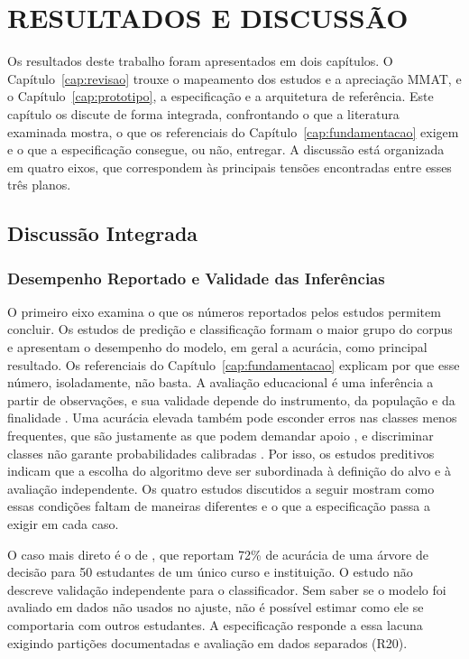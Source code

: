 \chapter{RESULTADOS E DISCUSSÃO}
\label{cap:resultados-discussao}

Os resultados deste trabalho foram apresentados em dois capítulos. O Capítulo~\ref{cap:revisao} trouxe o mapeamento dos estudos e a apreciação MMAT, e o Capítulo~\ref{cap:prototipo}, a especificação e a arquitetura de referência. Este capítulo os discute de forma integrada, confrontando o que a literatura examinada mostra, o que os referenciais do Capítulo~\ref{cap:fundamentacao} exigem e o que a especificação consegue, ou não, entregar. A discussão está organizada em quatro eixos, que correspondem às principais tensões encontradas entre esses três planos.

\section{Discussão Integrada}

\subsection{Desempenho Reportado e Validade das Inferências}

O primeiro eixo examina o que os números reportados pelos estudos permitem concluir. Os estudos de predição e classificação formam o maior grupo do corpus e apresentam o desempenho do modelo, em geral a acurácia, como principal resultado. Os referenciais do Capítulo~\ref{cap:fundamentacao} explicam por que esse número, isoladamente, não basta. A avaliação educacional é uma inferência a partir de observações, e sua validade depende do instrumento, da população e da finalidade \cite{NRC2001}. Uma acurácia elevada também pode esconder erros nas classes menos frequentes, que são justamente as que podem demandar apoio \cite{James2021}, e discriminar classes não garante probabilidades calibradas \cite{NiculescuMizilCaruana2005}. Por isso, os estudos preditivos indicam que a escolha do algoritmo deve ser subordinada à definição do alvo e à avaliação independente. Os quatro estudos discutidos a seguir mostram como essas condições faltam de maneiras diferentes e o que a especificação passa a exigir em cada caso.

O caso mais direto é o de , que reportam 72\% de acurácia de uma árvore de decisão para 50 estudantes de um único curso e instituição. O estudo não descreve validação independente para o classificador. Sem saber se o modelo foi avaliado em dados não usados no ajuste, não é possível estimar como ele se comportaria com outros estudantes. A especificação responde a essa lacuna exigindo partições documentadas e avaliação em dados separados (R20).

